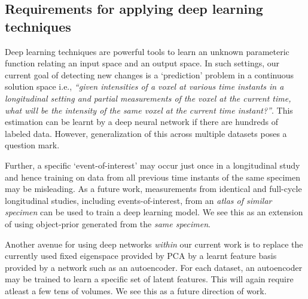 \documentclass[journal]{IEEEtran}
\begin{document}
\subsection{Requirements for applying deep learning techniques}
Deep learning techniques are powerful tools to learn an unknown
parameteric function relating an input space and an output space. In such
settings, our current goal of detecting new changes is a `prediction'
problem in a continuous solution space i.e., \textit{``given
  intensities of a voxel at various time instants in a longitudinal
  setting and partial measurements of the voxel at the current time,
  what will be the intensity of the same voxel at the current time
  instant?''}. This estimation can be learnt by a deep neural network
if there are hundreds of labeled data.  However, generalization of
this across multiple datasets poses a question mark.

  Further, a specific `event-of-interest' may occur just once in a
  longitudinal study and hence training on data from all previous time
  instants of the same specimen may be misleading. As a future work, measurements from
  identical and full-cycle longitudinal studies, including
  events-of-interest, from an \textit{atlas of similar specimen} can be used to train
  a deep learning model.  We  see this as an extension of using object-prior generated from the
  \textit{same specimen}.

  Another avenue for using deep networks \textit{within} our current
  work is to replace the currently used fixed eigenspace provided by
  PCA by a learnt feature basis provided by a network such as an
  autoencoder. For each dataset, an autoencoder may be trained to
  learn a specific set of latent features. This will again require
  atleast a few tens of volumes. We see this as a future direction of
  work.



\end{document}

